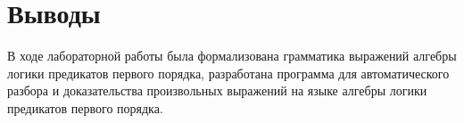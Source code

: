 \chapter*{Выводы}

В ходе лабораторной работы была формализована грамматика выражений алгебры логики предикатов первого порядка, разработана программа для автоматического разбора и доказательства произвольных выражений на языке алгебры логики предикатов первого порядка.
